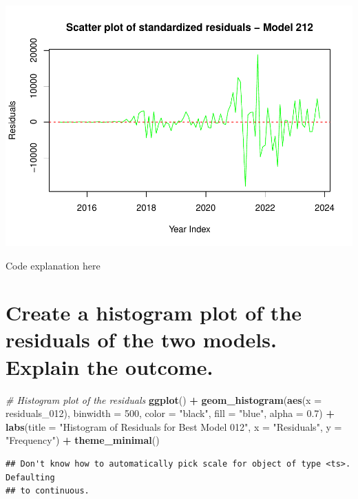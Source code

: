 \documentclass[
]{book}
\newenvironment{Shaded}{\begin{snugshade}}{\end{snugshade}}
\newcommand{\AttributeTok}[1]{\textcolor[rgb]{0.13,0.29,0.53}{#1}}
\newcommand{\CommentTok}[1]{\textcolor[rgb]{0.56,0.35,0.01}{\textit{#1}}}
\newcommand{\DecValTok}[1]{\textcolor[rgb]{0.00,0.00,0.81}{#1}}
\newcommand{\FloatTok}[1]{\textcolor[rgb]{0.00,0.00,0.81}{#1}}
\newcommand{\FunctionTok}[1]{\textcolor[rgb]{0.13,0.29,0.53}{\textbf{#1}}}
\newcommand{\NormalTok}[1]{#1}
\newcommand{\SpecialCharTok}[1]{\textcolor[rgb]{0.81,0.36,0.00}{\textbf{#1}}}
\newcommand{\StringTok}[1]{\textcolor[rgb]{0.31,0.60,0.02}{#1}}
\begin{document}
\includegraphics{bookdown-demo_files/figure-latex/unnamed-chunk-48-4.pdf}

Code explanation here

\section{Create a histogram plot of the residuals of the two models. Explain the outcome.}\label{create-a-histogram-plot-of-the-residuals-of-the-two-models.-explain-the-outcome.}

\begin{Shaded}
\begin{Highlighting}[]
\CommentTok{\# Histogram plot of the residuals}
\FunctionTok{ggplot}\NormalTok{() }\SpecialCharTok{+}
  \FunctionTok{geom\_histogram}\NormalTok{(}\FunctionTok{aes}\NormalTok{(}\AttributeTok{x =}\NormalTok{ residuals\_012), }\AttributeTok{binwidth =} \DecValTok{500}\NormalTok{, }\AttributeTok{color =} \StringTok{"black"}\NormalTok{, }\AttributeTok{fill =} \StringTok{"blue"}\NormalTok{, }\AttributeTok{alpha =} \FloatTok{0.7}\NormalTok{) }\SpecialCharTok{+}
  \FunctionTok{labs}\NormalTok{(}\AttributeTok{title =} \StringTok{"Histogram of Residuals for Best Model 012"}\NormalTok{, }\AttributeTok{x =} \StringTok{"Residuals"}\NormalTok{, }\AttributeTok{y =} \StringTok{"Frequency"}\NormalTok{) }\SpecialCharTok{+}
  \FunctionTok{theme\_minimal}\NormalTok{()}
\end{Highlighting}
\end{Shaded}

\begin{verbatim}
## Don't know how to automatically pick scale for object of type <ts>. Defaulting
## to continuous.
\end{verbatim}
\end{document}

